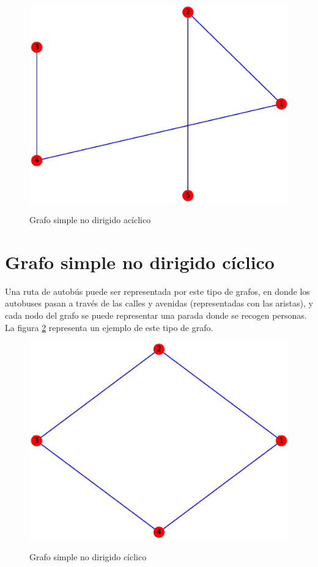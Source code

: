 \documentclass{article}
\begin{document}
\begin{figure}[h!]
    \caption{Grafo simple no dirigido acíclico}
    \includegraphics[width=\textwidth]{1-GSNDA}
    \label{fig:GSNDA}
\end{figure}





\section{Grafo simple no dirigido cíclico}
Una ruta de autobús puede ser representada por este tipo de grafos, en donde los autobuses pasan a través de las calles y avenidas (representadas con las aristas), y cada nodo del grafo se puede representar una parada donde se recogen personas. La figura \ref{fig:GSNDC} representa un ejemplo de este tipo de grafo.
\begin{figure}[h!]
    \caption{Grafo simple no dirigido cíclico}
    \includegraphics[width=\textwidth]{2-GSNDC}
    \label{fig:GSNDC}
\end{figure}
\end{document}
